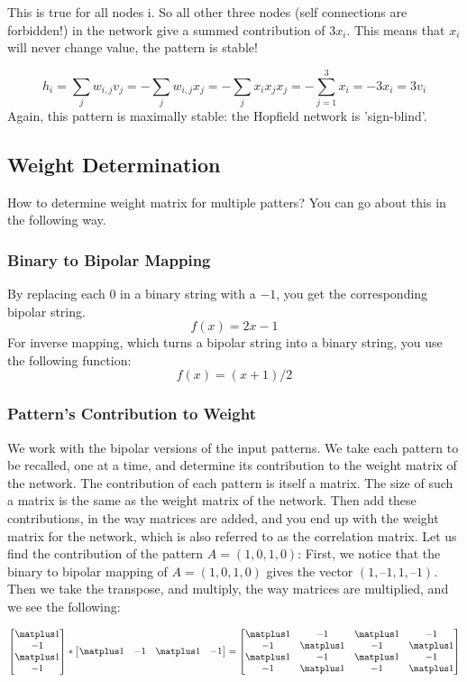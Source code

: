 This is true for all nodes i. So all other three nodes (self connections are
forbidden!) in the network give a summed contribution of $3x_i$. This means that $x_i$ will never change value, the pattern is stable!

\[
h_i = \sum_j w_{i,j}v_j = - \sum_j w_{i,j}x_j = - \sum_j x_ix_jx_j = -\sum^3_{j=1} x_i = −3x_i = 3v_i
\]
Again, this pattern is maximally stable: the Hopfield network is ’sign-blind’.

\subsection{Weight Determination}
How to determine weight matrix for multiple patters? You can go about this in the following way.
\subsubsection{Binary to Bipolar Mapping}
By replacing each $0$ in a binary string with a $-1$, you get the corresponding bipolar string.
\[
f(x) = 2x - 1
\]
For inverse mapping, which turns a bipolar string into a binary string, you use
the following function:
\[
f(x) = (x + 1) / 2
\]
\subsubsection{Pattern’s Contribution to Weight}
We work with the bipolar versions of the input patterns. We take each
pattern to be recalled, one at a time, and determine its contribution to the
weight matrix of the network. The contribution of each pattern is itself a
matrix. The size of such a matrix is the same as the weight matrix of the
network. Then add these contributions, in the way matrices are added, and you
end up with the weight matrix for the network, which is also referred to as the
correlation matrix. Let us find the contribution of the pattern $A = (1, 0, 1, 0)$:
First, we notice that the binary to bipolar mapping of $A = (1, 0, 1, 0)$ gives the
vector $(1, –1, 1, –1)$.
Then we take the transpose, and multiply, the way matrices are multiplied, and
we see the following:

\[ 
\begin{bmatrix}
\matplus1  \\
-1  \\
\matplus1  \\
-1  \\
\end{bmatrix}
*
\begin{bmatrix}
 \matplus1 & -1 & \matplus1 & -1  \\
\end{bmatrix}
=
\begin{bmatrix}
 \matplus1 & -1 &  \matplus1 & -1 \\
-1 &  \matplus1 & -1 &  \matplus1 \\
 \matplus1 & -1 &  \matplus1 & -1 \\
-1 & \matplus1 & -1 &  \matplus1 \\
\end{bmatrix}
\]

